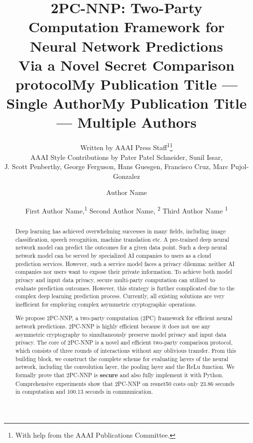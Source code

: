 \documentclass[letterpaper]{article} %
\title{2PC-NNP: Two-Party Computation Framework for Neural Network Predictions \\ Via a Novel Secret Comparison protocol}
\author{
    Written by AAAI Press Staff\textsuperscript{\rm 1}\thanks{With help from the AAAI Publications Committee.}\\
    AAAI Style Contributions by Pater Patel Schneider,
    Sunil Issar,\\
    J. Scott Penberthy,
    George Ferguson,
    Hans Guesgen,
    Francisco Cruz\equalcontrib,
    Marc Pujol-Gonzalez\equalcontrib
}
\title{My Publication Title --- Single Author}
\author {
    Author Name
}
\title{My Publication Title --- Multiple Authors}
\author {
    First Author Name,\textsuperscript{\rm 1}
    Second Author Name, \textsuperscript{\rm 2}
    Third Author Name \textsuperscript{\rm 1}
}
\begin{document}
\maketitle

\begin{abstract}

    Deep learning has achieved overwhelming successes in many fields, including image classification, speech recognition, machine translation etc.
    A pre-trained deep neural network model can predict the outcomes
    for a given data point. Such a deep neural network model can be served by
    specialized AI companies to users as a cloud prediction services.
    However, such a service model faces a privacy dilemma: neither AI companies nor
    users want to expose their private information.
    To achieve both model privacy and input data privacy,
    secure multi-party computation can utilized to evaluate prediction outcomes. However,
    this strategy is further complicated due to the complex deep learning prediction process.
    Currently, all existing solutions are very inefficient for employing complex asymmetric cryptographic operations.

    We propose 2PC-NNP, a two-party computation (2PC) framework for efficient neural network predictions.
    2PC-NNP is highly efficient because it does not use any asymmetric cryptography to simultaneously preserve model privacy and input data privacy.
    The core of 2PC-NNP is a novel and efficient two-party comparison protocol,
    which consists of three rounds of interactions without any oblivious transfer.
    From this building block, we construct the complete scheme for evaluating layers of the neural network, including the convolution layer, the pooling layer and the ReLu function.
	We formally prove that 2PC-NNP is {\bf secure} and also fully implement it with Python.
    Comprehensive experiments show that 2PC-NNP on resnet50
    costs only 23.86 seconds in computation and 100.13 seconds in communication.



\end{abstract}
\end{document}
